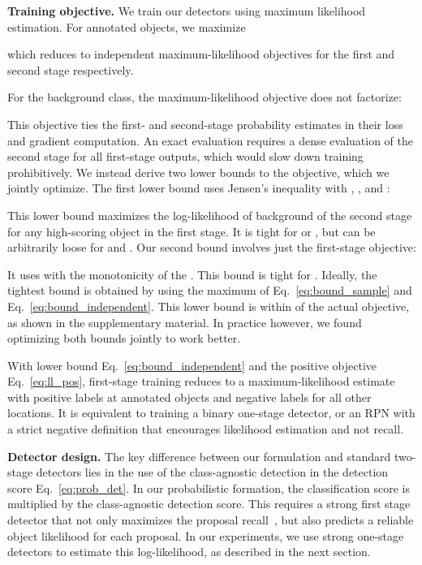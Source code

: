 \documentclass{article}
\renewcommand{\paragraph}[1]{\noindent\textbf{#1}}
\newcommand{\shortrefeq}[1]{Eq.~\eqref{eq:#1}}
\begin{document}
\paragraph{Training objective.} We train our detectors using maximum likelihood estimation.
For annotated objects, we maximize

which reduces to independent maximum-likelihood objectives for the first and second stage respectively.

For the background class, the maximum-likelihood objective does not factorize:

This objective ties the first- and second-stage probability estimates in their loss and gradient computation.
An exact evaluation requires a dense evaluation of the second stage for all first-stage outputs, which would slow down training prohibitively.
We instead derive two lower bounds to the objective, which we jointly optimize.
The first lower bound uses Jensen's inequality  with , , and :

This lower bound maximizes the log-likelihood of background of the second stage for any high-scoring object in the first stage.
It is tight for  or , but can be arbitrarily loose for  and .
Our second bound involves just the first-stage objective:

It uses  with the monotonicity of the .
This bound is tight for .
Ideally, the tightest bound is obtained by using the maximum of \shortrefeq{bound_sample} and \shortrefeq{bound_independent}.
This lower bound is within  of the actual objective, as shown in the supplementary material.
In practice however, we found optimizing both bounds jointly to work better.

With lower bound \shortrefeq{bound_independent} and the positive objective \shortrefeq{ll_pos}, first-stage training reduces to a maximum-likelihood estimate with positive labels at annotated objects and negative labels for all other locations.
It is equivalent to training a binary one-stage detector, or an RPN with a strict negative definition that encourages likelihood estimation and not recall.

\paragraph{Detector design.}
The key difference between our formulation and standard two-stage detectors lies in the use of the class-agnostic detection  in the detection score \shortrefeq{prob_det}.
In our probabilistic formation, the classification score is multiplied by the class-agnostic detection score.
This requires a strong first stage detector that not only maximizes the proposal recall~\cite{ren2015faster,uijlings2013selective}, but also predicts a reliable object likelihood for each proposal.
In our experiments, we use strong one-stage detectors to estimate this log-likelihood, as described in the next section.
\end{document}
